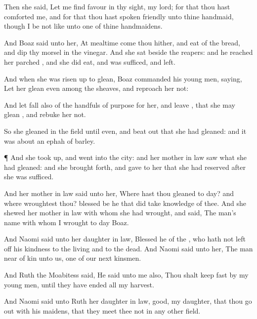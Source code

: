 {Then she
said, Let me
find
favour in thy
sight, my
lord; for that thou hast
comforted me, and for that thou hast
spoken
friendly unto thine
handmaid, though I be not like unto
one of thine
handmaidens.

And
Boaz
said unto her, At
mealtime
come thou
hither, and
eat of the
bread, and
dip thy
morsel in the
vinegar. And she
sat
beside the
reapers: and he
reached her
parched
{}, and she did
eat, and was
sufficed, and
left.

And when she was risen
up to
glean,
Boaz
commanded his young
men,
saying, Let her
glean even among the
sheaves, and
reproach her not:

And let
fall also
{} of the
handfuls of
purpose for her, and
leave
{}, that she may
glean
{}, and
rebuke her not.


\par }{\PP {}So she
gleaned in the
field until
even, and beat
out that she had
gleaned: and it was about an
ephah of
barley.


\par }{\PP {}¶ And she took
{}
up, and
went into the
city: and her mother in
law
saw what she had
gleaned: and she brought
forth, and
gave to her that she had
reserved after she was
sufficed.

And her mother in
law
said unto her, Where hast thou
gleaned to
day? and
where
wroughtest thou?
blessed be he that did take
knowledge of thee. And she
shewed her mother in
law with whom she had
wrought, and
said, The
man’s
name with whom I
wrought to
day
{}
Boaz.

And
Naomi
said unto her daughter in
law,
Blessed
{} he of the
{}, who hath not left
off his
kindness to the
living and to the
dead. And
Naomi
said unto her, The
man
{} near of
kin unto us, one of our next
kinsmen.

And
Ruth the
Moabitess
said, He
said unto me also, Thou shalt keep
fast by my young
men, until they have
ended all my
harvest.

And
Naomi
said unto
Ruth her daughter in
law,
{}
good, my
daughter, that thou go
out with his
maidens, that they
meet thee not in any
other
field.

}

